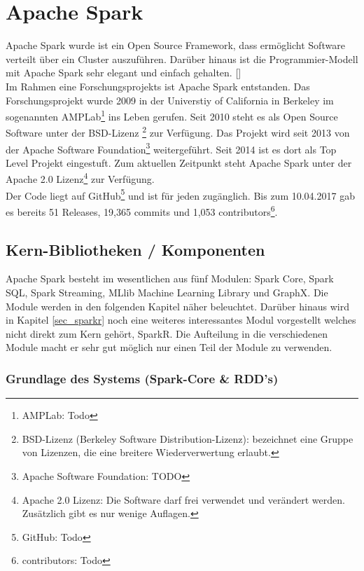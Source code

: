 \newpage
\chapter{Apache Spark} 

Apache Spark wurde ist ein Open Source Framework, dass ermöglicht Software verteilt \"uber ein Cluster auszuführen. Dar\"uber hinaus ist die Programmier-Modell mit Apache Spark sehr elegant und einfach gehalten. [\cite{AAWS15}] \\
Im Rahmen eine Forschungsprojekts ist Apache Spark entstanden. Das Forschungsprojekt wurde 2009 in der Universtiy of California in Berkeley im sogenannten AMPLab\footnote{AMPLab: Todo} ins Leben gerufen. Seit 2010 steht es als Open Source Software unter der BSD-Lizenz \footnote{BSD-Lizenz (Berkeley Software Distribution-Lizenz): bezeichnet eine Gruppe von Lizenzen, die eine breitere Wiederverwertung erlaubt.} zur Verfügung. Das Projekt wird seit 2013 von der Apache Software Foundation\footnote{Apache Software Foundation: TODO} weitergef\"uhrt. Seit 2014 ist es dort als Top Level Projekt eingestuft. Zum aktuellen Zeitpunkt steht Apache Spark unter der Apache 2.0 Lizenz\footnote{Apache 2.0 Lizenz: Die Software darf frei verwendet und ver\"andert werden. Zus\"atzlich gibt es nur wenige Auflagen.} zur Verf\"ugung. \\
Der Code liegt auf GitHub\footnote{GitHub: Todo } und ist f\"ur jeden zug\"anglich. Bis zum 10.04.2017 gab es bereits 51 Releases, 19,365 commits und 1,053 contributors\footnote{contributors: Todo }.


\section{Kern-Bibliotheken / Komponenten}

Apache Spark besteht im wesentlichen aus f\"unf Modulen: Spark Core, Spark SQL, Spark Streaming, MLlib Machine Learning Library und GraphX. 
Die Module werden in den folgenden Kapitel n\"aher beleuchtet. 
Dar\"uber hinaus wird in Kapitel \ref{sec_sparkr} noch eine weiteres interessantes Modul vorgestellt welches nicht direkt zum Kern geh\"ort, SparkR.
Die Aufteilung in die verschiedenen Module macht er sehr gut m\"oglich nur einen Teil der Module zu verwenden. 

\subsection{Grundlage des Systems (Spark-Core \& RDD’s)}\label{sec_sparkcore}

